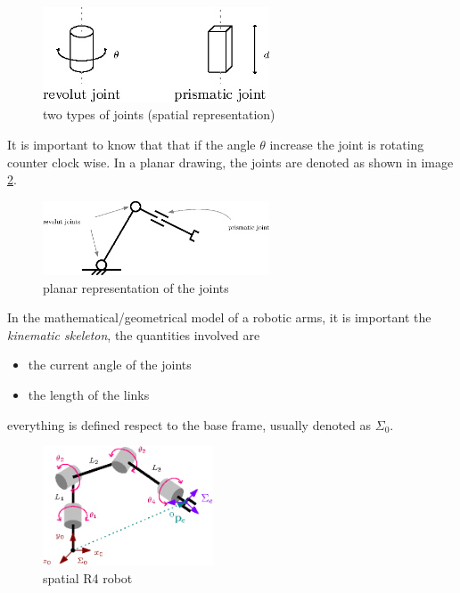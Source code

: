 \documentclass[10pt, letterpaper]{report}
\begin{document}
\begin{figure}[h!]
    \centering
    \includegraphics[width=0.6\textwidth ]{images/joints.eps} 
    \caption{two types of joints (spatial representation)}
    \label{img:joints}
\end{figure}

It is important to know that that if the angle $\theta$ increase the joint is rotating counter clock wise. In a planar drawing, the joints are denoted as shown in image \ref{img:joints_planar}.

\begin{figure}[h!]
    \centering
    \includegraphics[width=0.6\textwidth ]{images/joints_planar.eps} 
    \caption{planar representation of the joints}
    \label{img:joints_planar}
\end{figure}

In the mathematical/geometrical model of a robotic arms, it is important the \textit{kinematic skeleton}, the quantities involved are\begin{itemize}
    \item the current angle of the joints
    \item the length of the links
\end{itemize}
everything is defined respect to the base frame, usually denoted as $\Sigma_0$.

\begin{figure}[h!]
    \centering
    \includegraphics[width=0.45\textwidth ]{images/spatial_robot_new.eps} 
    \caption{spatial R4 robot}
    \label{img:spatialR4}
\end{figure}
\bigskip
\end{document}

